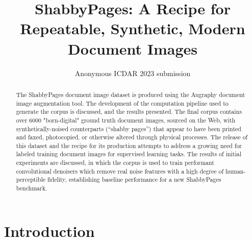 \documentclass[runningheads]{llncs}
\begin{document}
\title{ShabbyPages: A Recipe for Repeatable, Synthetic, Modern Document Images}
%
%

\author{Anonymous ICDAR 2023 submission}


\maketitle

\begin{abstract}
The ShabbyPages document image dataset is produced using the Augraphy document image augmentation tool.
The development of the computation pipeline used to generate the corpus is discussed, and the results presented.
The final corpus contains over 6000 "born-digital" ground truth document images, sourced on the Web, with synthetically-noised counterparts (``shabby pages'') that appear to have been printed and faxed, photocopied, or otherwise altered through physical processes.
The release of this dataset and the recipe for its production attempts to address a growing need for labeled training document images for supervised learning tasks.
The results of initial experiments are discussed, in which the corpus is used to train performant convolutional denoisers which remove real noise features with a high degree of human-perceptible fidelity, establishing baseline performance for a new ShabbyPages benchmark.
\end{abstract}

\section{Introduction}
\end{document}
